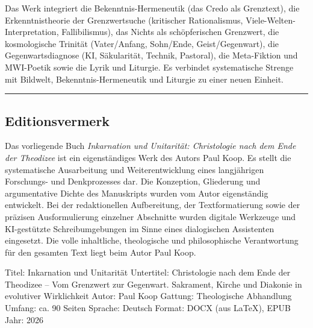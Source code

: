 \documentclass[
  ngerman,
]{article}
\begin{document}
Das Werk integriert die Bekenntnis-Hermeneutik (das Credo als
Grenztext), die Erkenntnistheorie der Grenzwertsuche (kritischer
Rationalismus, Viele-Welten-Interpretation, Fallibilismus), das Nichts
als schöpferischen Grenzwert, die kosmologische Trinität (Vater/Anfang,
Sohn/Ende, Geist/Gegenwart), die Gegenwartsdiagnose (KI, Säkularität,
Technik, Pastoral), die Meta-Fiktion und MWI-Poetik sowie die Lyrik und
Liturgie. Es verbindet systematische Strenge mit Bildwelt,
Bekenntnis-Hermeneutik und Liturgie zu einer neuen Einheit.

\begin{center}\rule{0.5\linewidth}{0.5pt}\end{center}

\subsection{Editionsvermerk}\label{editionsvermerk}

Das vorliegende Buch \emph{Inkarnation und Unitarität: Christologie nach
dem Ende der Theodizee} ist ein eigenständiges Werk des Autors Paul
Koop. Es stellt die systematische Ausarbeitung und Weiterentwicklung
eines langjährigen Forschungs- und Denkprozesses dar. Die Konzeption,
Gliederung und argumentative Dichte des Manuskripts wurden vom Autor
eigenständig entwickelt. Bei der redaktionellen Aufbereitung, der
Textformatierung sowie der präzisen Ausformulierung einzelner Abschnitte
wurden digitale Werkzeuge und KI-gestützte Schreibumgebungen im Sinne
eines dialogischen Assistenten eingesetzt. Die volle inhaltliche,
theologische und philosophische Verantwortung für den gesamten Text
liegt beim Autor Paul Koop.

Titel: Inkarnation und Unitarität Untertitel: Christologie nach dem Ende
der Theodizee -- Vom Grenzwert zur Gegenwart. Sakrament, Kirche und
Diakonie in evolutiver Wirklichkeit Autor: Paul Koop Gattung:
Theologische Abhandlung Umfang: ca. 90 Seiten Sprache: Deutsch Format:
DOCX (aus LaTeX), EPUB Jahr: 2026
\end{document}
